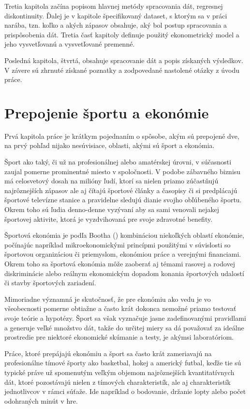 \documentclass[
  digital, %
  oneside, %
  notable,   %
  lof,     %
  lot,     %
]{fithesis3}
\begin{document}
	Tretia kapitola začína popisom hlavnej metódy spracovania dát, regresnej diskontinuity. Ďalej je v kapitole špecifikovaný dataset, s ktorým sa v práci narába, tzn. koľko a akých zápasov obsahuje, aký bol postup spracovania a prispôsobenia dát. Tretia časť kapitoly definuje použitý ekonometrický model a jeho vysvetľovanú a vysvetľované premenné.
	
	Posledná kapitola, štvrtá, obsahuje spracovanie dát a popis získaných výsledkov. V závere sú zhrnuté získané poznatky a zodpovedané nastolené otázky z úvodu práce.
	

	\chapter{Prepojenie športu a ekonómie}
	Prvá kapitola práce je krátkym pojednaním o spôsobe, akým sú prepojené dve, na prvý pohľad nijako nesúvisiace, oblasti, akými sú šport a ekonómia.
	
	Šport ako taký, či už na profesionálnej alebo amatérskej úrovni, v súčasnosti zaujal pomerne prominentné miesto v spoločnosti. V podobe zábavného biznisu má celosvetový dosah na milióny ľudí, ktorí sa nielen priamo zúčastňujú najrôznejších zápasov ale aj čítajú športové články a časopisy či si predplácajú športové televízne stanice a pravidelne sledujú dianie svojho obľúbeného športu. \parencite{conrad2011} Okrem toho sú ľudia denno-denne vyzývaní aby sa sami venovali nejakej športovej aktivite, ktorá je vyzdvihovaná pre svoje zdravotné benefity.
	
	Športová ekonómia je podľa Bootha (\citeyear[s.~377]{booth2009}) kombináciou niekoľkých oblastí ekonómie, počínajúc napríklad mikroekonomickými princípmi použitými v súvislosti so športovou organizáciou či priemyslom, ekonómiou práce a verejnými financiami. Okrem toho sa športová ekonómia môže zaoberať aj témami rasovej a rodovej diskriminácie alebo reálnym ekonomickým dopadom konania športových udalostí či stavby športových zariadení. 
	
	Mimoriadne významná je skutočnosť, že pre ekonómiu ako vedu je vo všeobecnosti pomerne obtiažne a často krát dokonca nemožné  priamo testovať svoje teórie a hypotézy. Šport sa však vyznačuje jasne zadefinovanými pravidlami a generuje veľké množstvo dát, takže do určitej miery sa dá považovať za ideálne prostredie pre niektoré ekonomické skúmanie a testy, je akýmsi laboratóriom.
	
	Práce, ktoré prepájajú ekonómiu a šport sa často krát zameriavajú na profesionálne tímové športy ako basketbal, hokej a americký futbal, keďže tie sú typické práve už spomenutým veľkým objemom najrôznejších kvantitatívnych dát, ktoré pozostávajú nielen z tímových charakteristík, ale aj charakteristík jednotlivcov v rámci súťaže. Ide napríklad o bodovanie, držanie lopty alebo počet odohraných minút v hre.
	
\end{document}
